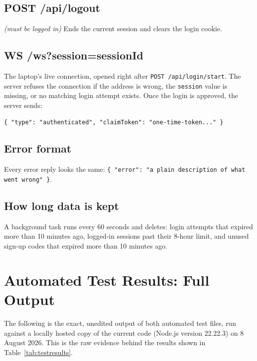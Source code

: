 \section*{POST /api/logout} \textit{(must be logged in)}
Ends the current session and clears the login cookie.

\section*{WS /ws?session=sessionId}
The laptop's live connection, opened right after
\texttt{POST /api/login/start}. The server refuses the connection if the
address is wrong, the \texttt{session} value is missing, or no matching
login attempt exists. Once the login is approved, the server sends:
\begin{lstlisting}
{ "type": "authenticated", "claimToken": "one-time-token..." }
\end{lstlisting}

\section*{Error format}
Every error reply looks the same:
\texttt{\{ "error": "a plain description of what went wrong" \}}.

\section*{How long data is kept}
A background task runs every 60 seconds and deletes: login attempts that
expired more than 10 minutes ago, logged-in sessions past their 8-hour
limit, and unused sign-up codes that expired more than 10 minutes ago.

\chapter{Automated Test Results: Full Output}
\label{app:tests}

The following is the exact, unedited output of both automated test files,
run against a locally hosted copy of the current code (Node.js version
22.22.3) on 8 August 2026. This is the raw evidence behind the results
shown in Table~\ref{tab:testresults}.

